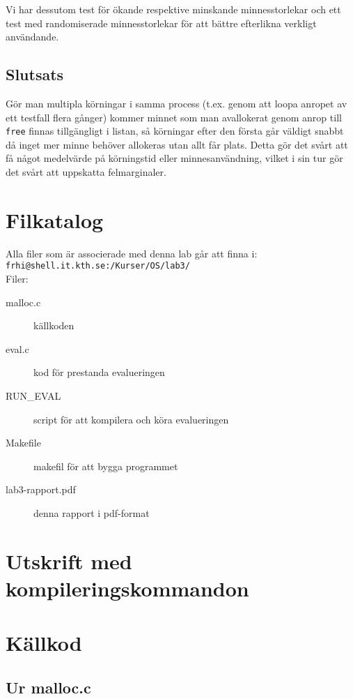 \documentclass[a4paper]{article}
\begin{document}
Vi har dessutom test för ökande respektive minskande minnesstorlekar och ett test med randomiserade minnesstorlekar för att bättre efterlikna verkligt användande.

\subsection*{Slutsats}
Gör man multipla körningar i samma process (t.ex. genom att loopa anropet av ett testfall flera gånger) kommer minnet som man avallokerat genom anrop till \texttt{free} finnas tillgängligt i listan, så körningar efter den första går väldigt snabbt då inget mer minne behöver allokeras utan allt får plats.
Detta gör det svårt att få något medelvärde på körningstid eller minnesanvändning, vilket i sin tur gör det svårt att uppskatta felmarginaler.

\section*{Filkatalog}
Alla filer som är associerade med denna lab går att finna i:\\
\texttt{frhi@shell.it.kth.se:/Kurser/OS/lab3/}
\\
Filer:
\begin{description}
\item[malloc.c] källkoden
\item[eval.c] kod för prestanda evalueringen
\item[RUN\_EVAL] script för att kompilera och köra evalueringen
\item[Makefile] makefil för att bygga programmet
\item[lab3-rapport.pdf] denna rapport i pdf-format
\end{description}

\section*{Utskrift med kompileringskommandon}


\section*{Källkod}
\subsection*{Ur malloc.c}

\end{document}
